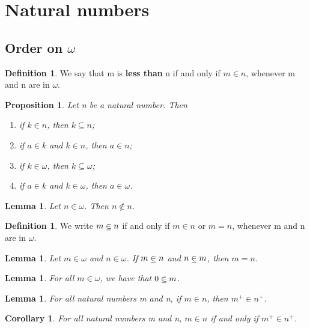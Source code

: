 \documentclass[letterpaper, 10pt]{article}
\numberwithin{thm}{subsection}
\newtheorem{lem}[thm]{Lemma}
\newtheorem{prop}[thm]{Proposition}
\newtheorem{col}[thm]{Corollary}
\theoremstyle{definition}
\newtheorem{mydef}[thm]{Definition}
\newcommand{\ineq}{%
	\mathrel{\mkern1mu\underline{\mkern-1mu\in\mkern-1mu}\mkern1mu}}
\begin{document}
\setcounter{section}{3}
\section{Natural numbers}

\setcounter{subsection}{3}
\subsection{Order on $\omega$}

\begin{mydef}
	We say that  m is \textbf{less than} n if and only if $m \in n$, whenever m and n are in $\omega$.
\end{mydef}

\begin{prop}
	Let n be a natural number. Then
	\begin{enumerate}[label=(\arabic*)]
		\item if $k \in n$, then $k \subseteq n$;
		\item if $a \in k$ and $k \in n$, then $a \in n$;
		\item if $k \in \omega$, then $k \subseteq \omega$;
		\item if $a \in k$ and $k \in \omega$, then $a \in \omega$.
	\end{enumerate}
\end{prop}

\begin{lem}
	Let $n \in \omega$. Then $n \notin n$.
\end{lem}

\begin{mydef}
	We write $m \ineq n$ if and only if $m \in n$ or $m = n$, whenever m and n are in $\omega$.
\end{mydef}

\begin{lem}
	Let $m \in \omega$ and $n \in \omega$. If $m \ineq n$ and $n \ineq m$, then $m = n$.
\end{lem}

\begin{lem}
	For all $m \in \omega$, we have that $0 \ineq m$.
\end{lem}

\begin{lem}
	For all natural numbers m and n, if $m \in n$, then $m^+ \in n^+$.
\end{lem}

\begin{col}
	For all natural numbers m and n, $m \in n$ if and only if $m^+ \in n^+$.
\end{col}
\end{document}
